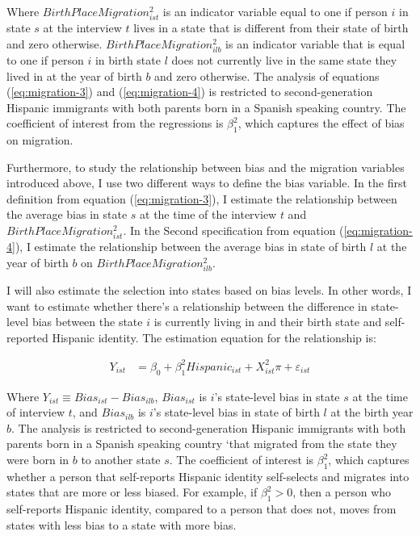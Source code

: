 \documentclass[12pt, fullpage]{article}
\begin{document}
Where $BirthPlaceMigration_{ist}^2$ is an indicator variable equal to one if person $i$ in state $s$ at the interview $t$ lives in a state that is different from their state of birth and zero otherwise. $BirthPlaceMigration_{ilb}^2$ is an indicator variable that is equal to one if person $i$ in birth state $l$ does not currently live in the same state they lived in at the year of birth $b$ and zero otherwise. The analysis of equations (\ref{eq:migration-3}) and (\ref{eq:migration-4}) is restricted to second-generation Hispanic immigrants with both parents born in a Spanish speaking country. The coefficient of interest from the regressions is $\beta_1^2$, which captures the effect of bias on migration.

Furthermore, to study the relationship between bias and the migration variables introduced above, I use two different ways to define the bias variable. In the first definition from equation (\ref{eq:migration-3}), I estimate the relationship between the average bias in state $s$ at the time of the interview $t$ and $BirthPlaceMigration_{ist}^2$. In the Second specification from equation (\ref{eq:migration-4}), I estimate the relationship between the average bias in state of birth $l$ at the year of birth $b$ on $BirthPlaceMigration_{ilb}^2$. 

I will also estimate the selection into states based on bias levels. In other words, I want to estimate whether there's a relationship between the difference in state-level bias between the state $i$ is currently living in and their birth state and self-reported Hispanic identity. The estimation equation for the relationship is:

\begin{align}
Y_{ist} &= \beta_0 + \beta_1^2 Hispanic_{ist} +
                   X_{ist}^2\pi
                   + \varepsilon_{ist} \label{eq:migration-5}
\end{align}

Where $Y_{ist} \equiv Bias_{ist} -  Bias_{ilb}$, $Bias_{ist}$ is $i$'s state-level bias in state $s$ at the time of interview $t$, and  $Bias_{ilb}$ is $i$'s state-level bias in state of birth $l$ at the birth year $b$. The analysis is restricted to second-generation Hispanic immigrants with both parents born in a Spanish speaking country `that migrated from the state they were born in $b$ to another state $s$. The coefficient of interest is $\beta_1^2$, which captures whether a person that self-reports Hispanic identity self-selects and migrates into states that are more or less biased. For example, if $\beta_1^2>0$, then a person who self-reports Hispanic identity, compared to a person that does not, moves from states with less bias to a state with more bias.
\end{document}
